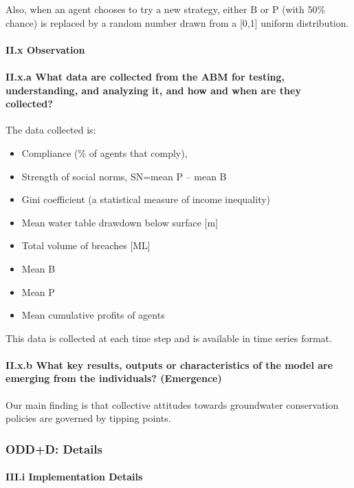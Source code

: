 \documentclass[12pt, a4paper]{article}
\begin{document}
Also, when an agent chooses to try a new strategy, either B or P (with 50\% chance) is replaced by a random number drawn from a [0,1] uniform distribution.

\paragraph{II.x Observation}

\paragraph{II.x.a What data are collected from the ABM for testing, understanding, and analyzing it, and how and when are they collected?}

The data collected is:

\begin{itemize} \item Compliance (\% of agents that comply), \item Strength of social norms, SN=mean P -- mean B \item Gini coefficient (a statistical measure of income inequality) \item Mean water table drawdown below surface [m] \item Total volume of breaches [ML] \item Mean B \item Mean P \item Mean cumulative profits of agents \end{itemize}

This data is collected at each time step and is available in time series format.

\paragraph{II.x.b What key results, outputs or characteristics of the model are emerging from the individuals? (Emergence)}

Our main finding is that collective attitudes towards groundwater conservation policies are governed by tipping points.

\subsubsection{ODD+D: Details}

\paragraph{III.i Implementation Details}
\end{document}
